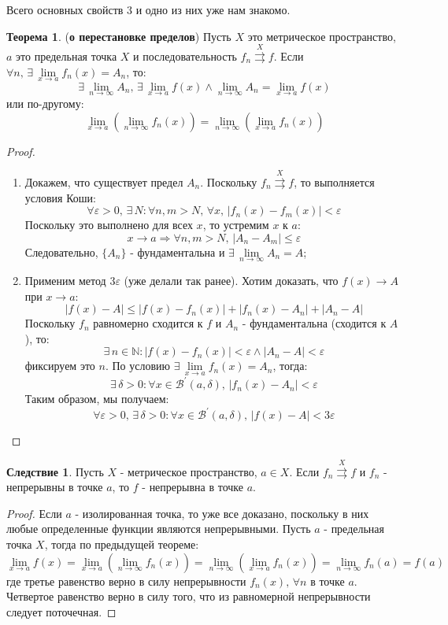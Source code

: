 \documentclass[12pt]{article}
\newcommand{\MN}{\mathbb{N}}
\newcommand{\MB}{\mathcal{B}}
\newcommand{\VE}{\varepsilon}
\theoremstyle{definition}
\newtheorem{theorem}{Теорема}
\newtheorem{corollary}{Следствие}
\newcommand{\uconv}[1]{\overset{#1}{\rightrightarrows}}
\begin{document}
Всего основных свойств $3$ и одно из них уже нам знакомо.
\begin{theorem}(\textbf{о перестановке пределов})
	Пусть $X$ это метрическое пространство, $a$ это предельная точка $X$ и последовательность $f_n \uconv{X} f$. Если $\forall n, \, \exists \, \lim\limits_{x \to a} f_n(x) = A_n$, то:
	$$
		\exists \, \lim\limits_{n \to \infty}A_n, \, \exists \, \lim\limits_{x \to a}f(x) \wedge \lim\limits_{n \to \infty} A_n = \lim\limits_{x \to a}f(x) 
	$$
	или по-другому:
	$$
		\lim\limits_{x \to a}\left(\lim\limits_{n \to \infty} f_n(x)\right) = \lim\limits_{n \to \infty}\left(\lim\limits_{x \to a}f_n(x)\right)
	$$
\end{theorem}
\begin{proof}\hfill
	\begin{enumerate}[label ={\arabic*)}]
		\item Докажем, что существует предел $A_n$. Поскольку $f_n \uconv{X} f$, то выполняется условия Коши:
		$$
			\forall \VE > 0, \, \exists \, N \colon \forall n,m > N, \, \forall x, \, |f_n(x) - f_m(x)| < \VE 		
		$$
		Поскольку это выполнено для всех $x$, то устремим $x$ к $a$:
		$$
			x \to a \Rightarrow \forall n,m > N, \, |A_n - A_m| \leq \VE 
		$$
		Следовательно, $\{A_n\}$ - фундаментальна  и  $\exists \, \lim\limits_{n \to \infty} A_n = A$;
		
		\item Применим метод $3\VE$ (уже делали так ранее). Хотим доказать, что $f(x) \to A$ при $x \to a$:
		$$
			|f(x) - A| \leq |f(x) - f_n(x)| + |f_n(x) - A_n| + |A_n - A|
		$$
		Поскольку $f_n$ равномерно сходится к $f$ и $A_n$ - фундаментальна (сходится к $A$), то:
		$$
			\exists \, n \in \MN \colon |f(x) - f_n(x)| < \VE \wedge |A_n - A| < \VE
		$$
		фиксируем это $n$. По условию $\exists \, \lim\limits_{x \to a} f_n(x) = A_n$, тогда:
		$$
			\exists \, \delta > 0 \colon \forall x \in \MB^\prime(a,\delta), \, |f_n(x) - A_n| < \VE
		$$
		Таким образом, мы получаем:
		$$
			\forall \VE > 0, \, \exists \, \delta > 0 \colon \forall x \in \MB^\prime(a,\delta), \, |f(x) - A| < 3\VE
		$$
	\end{enumerate}
\end{proof}
\begin{corollary}
	Пусть $X$ - метрическое пространство, $a \in X$. Если $f_n \uconv{X} f$ и $f_n$ - непрерывны в точке $a$, то $f$ - непрерывна в точке $a$.
\end{corollary}
\begin{proof}
	Если $a$ - изолированная точка, то  уже все доказано, поскольку в них любые определенные функции являются непрерывными. Пусть $a$ - предельная точка $X$, тогда по предыдущей теореме:
	$$
		\lim\limits_{x \to a}f(x) = \lim\limits_{x \to a}\left(\lim\limits_{n \to \infty}f_n(x) \right) = \lim\limits_{n \to \infty}\left(\lim\limits_{x \to a}f_n(x) \right) = \lim\limits_{n \to \infty}f_n(a) = f(a)
	$$
	где третье равенство верно в силу непрерывности $f_n(x), \, \forall n$ в точке $a$. Четвертое равенство верно в силу того, что из равномерной непрерывности следует поточечная.
\end{proof}
\end{document}
